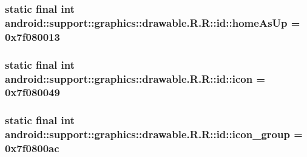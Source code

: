 \hypertarget{classandroid_1_1support_1_1graphics_1_1drawable_1_1_r_1_1id_3980e3ea25b7fb1cfed015dfbdbfc6eb}{
\subsubsection[{homeAsUp}]{\setlength{\rightskip}{0pt plus 5cm}static final int android::support::graphics::drawable.R.R::id::homeAsUp = 0x7f080013}}
\label{classandroid_1_1support_1_1graphics_1_1drawable_1_1_r_1_1id_3980e3ea25b7fb1cfed015dfbdbfc6eb}


\hypertarget{classandroid_1_1support_1_1graphics_1_1drawable_1_1_r_1_1id_2705726d320423401bee24a9579d8f51}{
\subsubsection[{icon}]{\setlength{\rightskip}{0pt plus 5cm}static final int android::support::graphics::drawable.R.R::id::icon = 0x7f080049}}
\label{classandroid_1_1support_1_1graphics_1_1drawable_1_1_r_1_1id_2705726d320423401bee24a9579d8f51}


\hypertarget{classandroid_1_1support_1_1graphics_1_1drawable_1_1_r_1_1id_ce68d1ff5ffab41be748bf4c4e69586c}{
\subsubsection[{icon\_\-group}]{\setlength{\rightskip}{0pt plus 5cm}static final int android::support::graphics::drawable.R.R::id::icon\_\-group = 0x7f0800ac}}
\label{classandroid_1_1support_1_1graphics_1_1drawable_1_1_r_1_1id_ce68d1ff5ffab41be748bf4c4e69586c}



